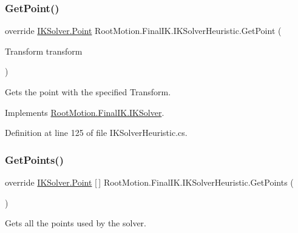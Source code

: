 \subsubsection{\texorpdfstring{Get\+Point()}{GetPoint()}}
{\footnotesize\ttfamily override \mbox{\hyperlink{class_root_motion_1_1_final_i_k_1_1_i_k_solver_1_1_point}{I\+K\+Solver.\+Point}} Root\+Motion.\+Final\+I\+K.\+I\+K\+Solver\+Heuristic.\+Get\+Point (\begin{DoxyParamCaption}\item[{Transform}]{transform }\end{DoxyParamCaption})\hspace{0.3cm}{\ttfamily [virtual]}}



Gets the point with the specified Transform. 



Implements \mbox{\hyperlink{class_root_motion_1_1_final_i_k_1_1_i_k_solver_a8e845886025fb0ca404b85f6747f7281}{Root\+Motion.\+Final\+I\+K.\+I\+K\+Solver}}.



Definition at line 125 of file I\+K\+Solver\+Heuristic.\+cs.

\mbox{\label{class_root_motion_1_1_final_i_k_1_1_i_k_solver_heuristic_a1b250288b7b2b165e6e7f30048410f05}} 
\subsubsection{\texorpdfstring{Get\+Points()}{GetPoints()}}
{\footnotesize\ttfamily override \mbox{\hyperlink{class_root_motion_1_1_final_i_k_1_1_i_k_solver_1_1_point}{I\+K\+Solver.\+Point}} \mbox{[}$\,$\mbox{]} Root\+Motion.\+Final\+I\+K.\+I\+K\+Solver\+Heuristic.\+Get\+Points (\begin{DoxyParamCaption}{ }\end{DoxyParamCaption})\hspace{0.3cm}{\ttfamily [virtual]}}



Gets all the points used by the solver. 




